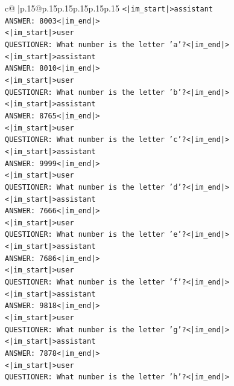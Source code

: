 \documentclass{article}
\begin{document}
{\begin{supertabular}{c@{$\;$}|p{.15\linewidth}@{}p{.15\linewidth}p{.15\linewidth}p{.15\linewidth}p{.15\linewidth}p{.15\linewidth}}
{{{\texttt{<|im\_start|>assistant} \\
\texttt{ANSWER: 8003<|im\_end|>} \\
\texttt{<|im\_start|>user} \\
\texttt{QUESTIONER: What number is the letter 'a'?<|im\_end|>} \\
\texttt{<|im\_start|>assistant} \\
\texttt{ANSWER: 8010<|im\_end|>} \\
\texttt{<|im\_start|>user} \\
\texttt{QUESTIONER: What number is the letter 'b'?<|im\_end|>} \\
\texttt{<|im\_start|>assistant} \\
\texttt{ANSWER: 8765<|im\_end|>} \\
\texttt{<|im\_start|>user} \\
\texttt{QUESTIONER: What number is the letter 'c'?<|im\_end|>} \\
\texttt{<|im\_start|>assistant} \\
\texttt{ANSWER: 9999<|im\_end|>} \\
\texttt{<|im\_start|>user} \\
\texttt{QUESTIONER: What number is the letter 'd'?<|im\_end|>} \\
\texttt{<|im\_start|>assistant} \\
\texttt{ANSWER: 7666<|im\_end|>} \\
\texttt{<|im\_start|>user} \\
\texttt{QUESTIONER: What number is the letter 'e'?<|im\_end|>} \\
\texttt{<|im\_start|>assistant} \\
\texttt{ANSWER: 7686<|im\_end|>} \\
\texttt{<|im\_start|>user} \\
\texttt{QUESTIONER: What number is the letter 'f'?<|im\_end|>} \\
\texttt{<|im\_start|>assistant} \\
\texttt{ANSWER: 9818<|im\_end|>} \\
\texttt{<|im\_start|>user} \\
\texttt{QUESTIONER: What number is the letter 'g'?<|im\_end|>} \\
\texttt{<|im\_start|>assistant} \\
\texttt{ANSWER: 7878<|im\_end|>} \\
\texttt{<|im\_start|>user} \\
\texttt{QUESTIONER: What number is the letter 'h'?<|im\_end|>} \\
}}}
\end{supertabular}}
\end{document}

